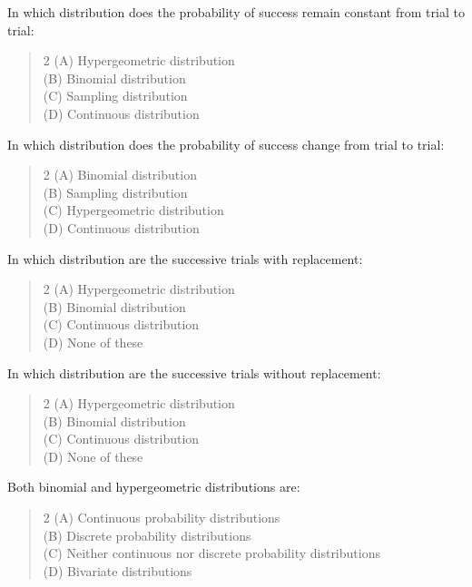 \documentclass[11pt,a4paper]{article}
\begin{document}
\begin{mcqlist}
\item In which distribution does the probability of success remain constant from trial to trial:
\begin{quote}\begin{multicols}{2}
\noindent (A) Hypergeometric distribution \\
(B) Binomial distribution \\
(C) Sampling distribution \\
(D) Continuous distribution
\end{multicols}\end{quote}

\item In which distribution does the probability of success change from trial to trial:
\begin{quote}\begin{multicols}{2}
\noindent (A) Binomial distribution \\
(B) Sampling distribution \\
(C) Hypergeometric distribution \\
(D) Continuous distribution
\end{multicols}\end{quote}

\item In which distribution are the successive trials with replacement:
\begin{quote}\begin{multicols}{2}
\noindent (A) Hypergeometric distribution \\
(B) Binomial distribution \\
(C) Continuous distribution \\
(D) None of these
\end{multicols}\end{quote}

\item In which distribution are the successive trials without replacement:
\begin{quote}\begin{multicols}{2}
\noindent (A) Hypergeometric distribution \\
(B) Binomial distribution \\
(C) Continuous distribution \\
(D) None of these
\end{multicols}\end{quote}

\item Both binomial and hypergeometric distributions are:
\begin{quote}\begin{multicols}{2}
\noindent (A) Continuous probability distributions \\
(B) Discrete probability distributions \\
(C) Neither continuous nor discrete probability distributions \\
(D) Bivariate distributions
\end{multicols}\end{quote}


\end{mcqlist}
\end{document}
